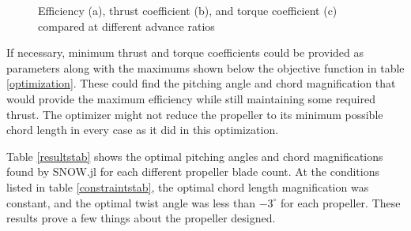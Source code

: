 \documentclass[journal ]{new-aiaa}
\begin{document}
\begin{figure}[H]
\centering

	\hspace{1em}
	\caption{Efficiency (a), thrust coefficient (b), and torque coefficient (c) compared at different advance ratios}
	\captionsetup{aboveskip=0pt,font=it}
	\label{efftqtab}
\end{figure}

If necessary, minimum thrust and torque coefficients could be provided as parameters along with the maximums shown below the objective function in table \ref{optimization}. These could find the pitching angle and chord magnification that would provide the maximum efficiency while still maintaining some required thrust. The optimizer might not reduce the propeller to its minimum possible chord length in every case as it did in this optimization.

Table \ref{resultstab} shows the optimal pitching angles and chord magnifications found by SNOW.jl for each different propeller blade count. At the conditions listed in table \ref{constraintstab}, the optimal chord length magnification was constant, and the optimal twist angle was less than $-3^{\circ}$ for each propeller. These results prove a few things about the propeller designed.
\end{document}
